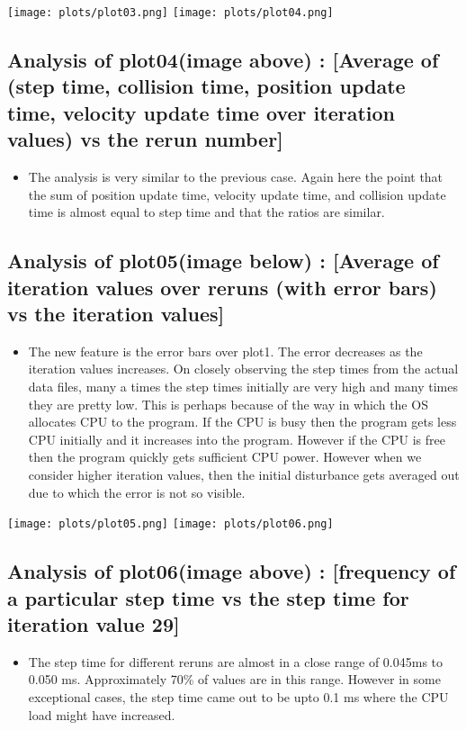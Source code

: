 \documentclass[english]{article}
\begin{document}
\texttt{[image: plots/plot03.png]}
\texttt{[image: plots/plot04.png]}

\subsection{Analysis of plot04(image above) : [Average of (step time, collision time, position update time, velocity update time over iteration values) vs the rerun number]}
\begin{itemize}
\item The analysis is very similar to the previous case. Again here the point that the sum of position update time, velocity update time, and collision update time is almost equal to step time and that the ratios are similar.
\end{itemize}

\subsection{Analysis of plot05(image below) : [Average of iteration values over reruns (with error bars) vs the iteration values]}
\begin{itemize}
\item The new feature is the error bars over plot1. The error decreases as the iteration values increases. On closely observing the step times from the actual data files, many a times the step times initially are very high and many times they are pretty low. This is perhaps because of the way in which the OS allocates CPU to the program. If the CPU is busy then the program gets less CPU initially and it increases into the program. However if the CPU is free then the program quickly gets sufficient CPU power. However when we consider higher iteration values, then the initial disturbance gets averaged out due to which the error is not so visible. 
\end{itemize}

\texttt{[image: plots/plot05.png]}
\texttt{[image: plots/plot06.png]}

\subsection{Analysis of plot06(image above) : [frequency of a particular step time vs the step time for iteration value 29]}
\begin{itemize}
\item The step time for different reruns are almost in a close range of 0.045ms to 0.050 ms. Approximately 70\% of values are in this range. However in some exceptional cases, the step time came out to be upto 0.1 ms where the CPU load might have increased.
\end{itemize}
\end{document}
